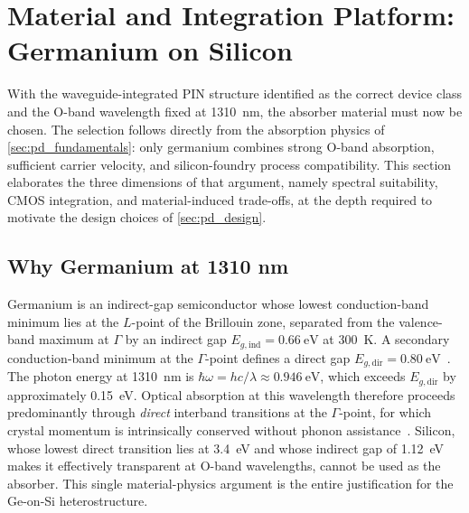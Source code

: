 \section[Material Platform: Ge-on-Si]{Material and Integration Platform: Germanium on Silicon}
\label{sec:pd_material}

With the waveguide-integrated PIN structure identified as the correct device class
and the O-band wavelength fixed at \SI{1310}{\nano\metre}, the absorber material
must now be chosen. The selection follows directly from the absorption physics of
\cref{sec:pd_fundamentals}: only germanium combines strong O-band absorption,
sufficient carrier velocity, and silicon-foundry process compatibility. This
section elaborates the three dimensions of that argument, namely spectral
suitability, CMOS integration, and material-induced trade-offs, at the depth
required to motivate the design choices of \cref{sec:pd_design}.

\subsection[Why Germanium at 1310 nm]{Why Germanium at 1310 nm}
\label{subsec:pd_bandstructure}

Germanium is an indirect-gap semiconductor whose lowest conduction-band minimum
lies at the $L$-point of the Brillouin zone, separated from the valence-band
maximum at $\Gamma$ by an indirect gap
$E_{g,\mathrm{ind}}=\SI{0.66}{\electronvolt}$ at \SI{300}{\kelvin}. A secondary
conduction-band minimum at the $\Gamma$-point defines a direct gap
$E_{g,\mathrm{dir}}=\SI{0.80}{\electronvolt}$~\cite{AshcroftMermin2021,Rossler2009,Ziman1972}.
The photon energy at \SI{1310}{\nano\metre} is
$\hbar\omega=hc/\lambda\approx\SI{0.946}{\electronvolt}$, which exceeds
$E_{g,\mathrm{dir}}$ by approximately \SI{0.15}{\electronvolt}. Optical absorption
at this wavelength therefore proceeds predominantly through \emph{direct} interband
transitions at the $\Gamma$-point, for which crystal momentum is intrinsically
conserved without phonon assistance~\cite{Basu2003,Kantorovich2004}. Silicon,
whose lowest direct transition lies at \SI{3.4}{\electronvolt} and whose indirect
gap of \SI{1.12}{\electronvolt} makes it effectively transparent at O-band
wavelengths, cannot be used as the absorber. This single material-physics argument
is the entire justification for the Ge-on-Si heterostructure.

